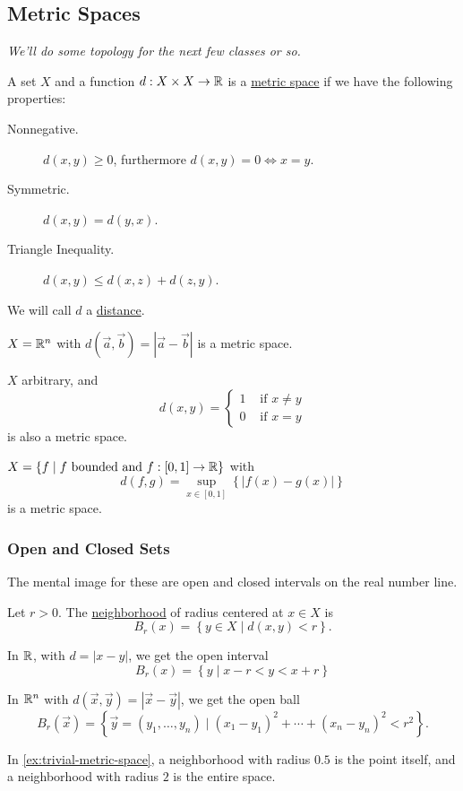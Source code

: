 \subsection{Metric Spaces}
\emph{We'll do some topology for the next few classes or so.}
\begin{definition}
    A set $X$ and a function $d : X\times X \to \mathbb R$ is a \ul{metric space} if we have the following properties:
    \begin{description}
        \item[Nonnegative.] $d(x, y) \geq 0$, furthermore $d(x, y) = 0\iff x = y$.
        \item[Symmetric.] $d(x, y) = d(y, x)$.
        \item[Triangle Inequality.] $d(x, y) \leq d(x, z) + d(z, y)$.
    \end{description}
    We will call $d$ a \ul{distance}.
\end{definition}
\begin{example}
    $X = \mathbb R^n$ with $d(\vec{a}, \vec{b}) = |\vec{a} - \vec{b}|$ is a metric space.
\end{example}
\begin{example}\label{ex:trivial-metric-space}
    $X$ arbitrary, and
    \[d(x, y) = \begin{cases}
            1 & \text{ if }x\neq y \\
            0 & \text{ if }x = y
        \end{cases}\]
    is also a metric space.
\end{example}
\begin{example}
    $X = \left\{ f\mid f \text{ bounded and }f : [0, 1]\to\mathbb R\right\}$ with
    \[d(f, g) = \sup_{x\in[0, 1]}\left\{ |f(x) - g(x)| \right\}\]
    is a metric space.
\end{example}

\subsubsection{Open and Closed Sets}
The mental image for these are open and closed intervals on the real number line.
\begin{definition}[Neighborhood]
    Let $r > 0$. The \ul{neighborhood} of radius centered at $x \in X$ is
    \[B_r(x) = \left\{ y \in X \mid d(x, y) < r \right\}.\]
\end{definition}
\begin{example}
    In $\mathbb R$, with $d = |x - y|$, we get the open interval
    \[B_r(x) = \left\{ y\mid x - r < y < x + r \right\}\]
\end{example}
\begin{example}
    In $\mathbb R^n$ with $d(\vec{x}, \vec{y}) = |\vec{x} - \vec{y}|$, we get the open ball
    \[B_r(\vec{x}) = \left\{ \vec{y} = (y_1, \dots, y_n)\mid (x_1 - y_1)^2 + \cdots + (x_n - y_n)^2 < r^2 \right\}.\]
\end{example}
\begin{example}
    In \cref{ex:trivial-metric-space}, a neighborhood with radius $0.5$ is the point itself, and a neighborhood with radius $2$ is the entire space.
\end{example}

